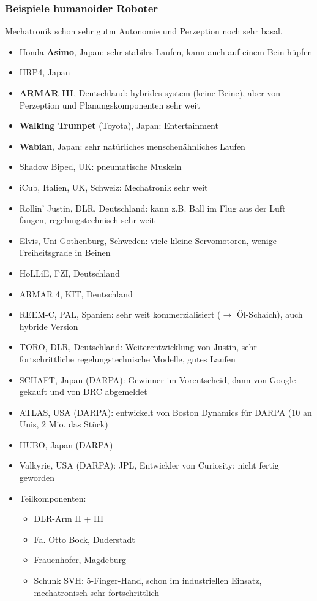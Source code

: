 \subsubsection{Beispiele humanoider Roboter}
Mechatronik schon sehr gutm Autonomie und Perzeption noch sehr basal.
\begin{itemize}
	\item Honda \textbf{Asimo}, Japan:  sehr stabiles Laufen, kann auch auf einem Bein hüpfen
	\item HRP4, Japan
	\item \textbf{ARMAR III}, Deutschland: hybrides system (keine Beine), aber von Perzeption und Planungskomponenten sehr weit
	\item \textbf{Walking Trumpet} (Toyota), Japan: Entertainment
	\item \textbf{Wabian}, Japan: sehr natürliches menschenähnliches Laufen
	\item Shadow Biped, UK: pneumatische Muskeln
	\item iCub, Italien, UK, Schweiz: Mechatronik sehr weit
	\item Rollin' Justin, DLR, Deutschland:  kann z.B. Ball im Flug aus der Luft fangen, regelungstechnisch sehr weit
	\item Elvis, Uni Gothenburg, Schweden: viele kleine Servomotoren, wenige Freiheitsgrade in Beinen
	\item HoLLiE, FZI, Deutschland
	\item ARMAR 4, KIT, Deutschland
	\item REEM-C, PAL, Spanien: sehr weit kommerzialisiert ($\rightarrow$ Öl-Schaich), auch hybride Version
	\item TORO, DLR, Deutschland: Weiterentwicklung von Justin, sehr fortschrittliche regelungstechnische Modelle, gutes Laufen
	\item SCHAFT, Japan (DARPA): Gewinner im Vorentscheid, dann von Google gekauft und von DRC abgemeldet
	\item ATLAS, USA (DARPA): entwickelt von Boston Dynamics für DARPA (10 an Unis, 2 Mio. das Stück)
	\item HUBO, Japan (DARPA)
	\item Valkyrie, USA (DARPA): JPL, Entwickler von Curiosity; nicht fertig geworden
	\item Teilkomponenten:
	\begin{itemize}
		\item DLR-Arm II + III
		\item Fa. Otto Bock, Duderstadt
		\item Frauenhofer, Magdeburg
		\item Schunk SVH: 5-Finger-Hand, schon im industriellen Einsatz, mechatronisch sehr fortschrittlich
	\end{itemize}
\end{itemize}

